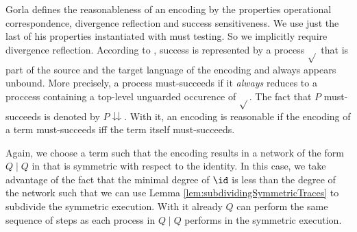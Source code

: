 \documentclass[11pt,techReport]{eptcs}
\begin{document}
Gorla \cite{gorla08d} defines the reasonableness of an encoding by the properties operational correspondence, divergence reflection and success sensitiveness. We use just the last of his properties instantiated with must testing. So we implicitly require divergence reflection. According to \cite{gorla08d}, success is represented by a process $ \sqrt{} $ that is part of the source and the target language of the encoding and always appears unbound. More precisely, a process must-succeeds if it \emph{always} reduces to a proccess containing a top-level unguarded occurence of $ \sqrt{} $. The fact that $ P $ must-succeeds is denoted by $ P \downdownarrows $. With it, an encoding is reasonable if the encoding of a term must-succeeds iff the term itself must-succeeds.


Again, we choose a term such that the encoding results in a network of the form $ Q \mid Q $ in \procsep that is symmetric with respect to the identity. In this case, we take advantage of the fact that the minimal degree of $ \id $ is less than the degree of the network such that we can use Lemma \ref{lem:subdividingSymmetricTraces} to subdivide the symmetric execution. With it already $ Q $ can perform the same sequence of steps as each process in $ Q \mid Q $ performs in the symmetric execution.
\end{document}
